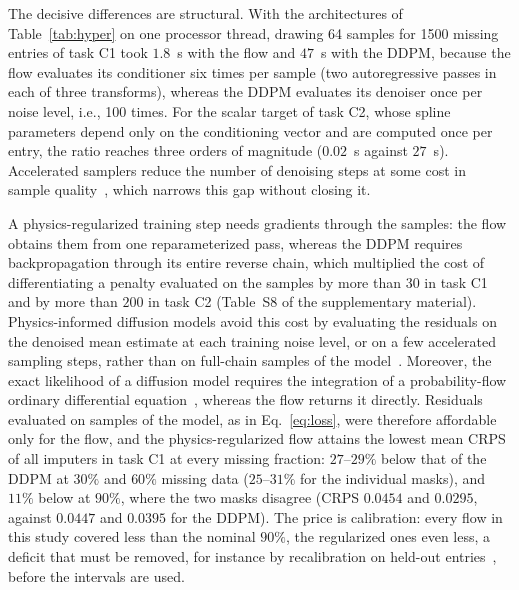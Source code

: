 The decisive differences are structural. With the architectures of Table~\ref{tab:hyper} on one processor thread, drawing 64 samples for 1500 missing entries of task C1 took $1.8$~s with the flow and $47$~s with the DDPM, because the flow evaluates its conditioner six times per sample (two autoregressive passes in each of three transforms), whereas the DDPM evaluates its denoiser once per noise level, i.e., 100 times. For the scalar target of task C2, whose spline parameters depend only on the conditioning vector and are computed once per entry, the ratio reaches three orders of magnitude ($0.02$~s against $27$~s). Accelerated samplers reduce the number of denoising steps at some cost in sample quality~\cite{SongMengErmon2021}, which narrows this gap without closing it.

A physics-regularized training step needs gradients through the samples: the flow obtains them from one reparameterized pass, whereas the DDPM requires backpropagation through its entire reverse chain, which multiplied the cost of differentiating a penalty evaluated on the samples by more than $30$ in task C1 and by more than $200$ in task C2 (Table~S8 of the supplementary material). Physics-informed diffusion models avoid this cost by evaluating the residuals on the denoised mean estimate at each training noise level, or on a few accelerated sampling steps, rather than on full-chain samples of the model~\cite{Bastek2025}. Moreover, the exact likelihood of a diffusion model requires the integration of a probability-flow ordinary differential equation~\cite{Song2021}, whereas the flow returns it directly. Residuals evaluated on samples of the model, as in Eq.~\eqref{eq:loss}, were therefore affordable only for the flow, and the physics-regularized flow attains the lowest mean CRPS of all imputers in task C1 at every missing fraction: $27$--$29\%$ below that of the DDPM at $30\%$ and $60\%$ missing data ($25$--$31\%$ for the individual masks), and $11\%$ below at $90\%$, where the two masks disagree (CRPS $0.0454$ and $0.0295$, against $0.0447$ and $0.0395$ for the DDPM). The price is calibration: every flow in this study covered less than the nominal $90\%$, the regularized ones even less, a deficit that must be removed, for instance by recalibration on held-out entries~\cite{Kuleshov2018}, before the intervals are used.
